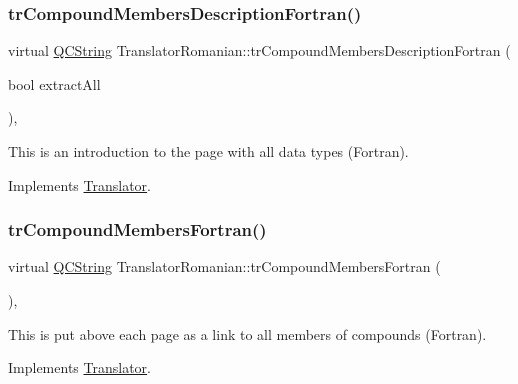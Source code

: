 \mbox{\label{class_translator_romanian_a96e3bb5b689655af4b189686d6fe4068}} 
\subsubsection{\texorpdfstring{trCompoundMembersDescriptionFortran()}{trCompoundMembersDescriptionFortran()}}
{\footnotesize\ttfamily virtual \mbox{\hyperlink{class_q_c_string}{Q\+C\+String}} Translator\+Romanian\+::tr\+Compound\+Members\+Description\+Fortran (\begin{DoxyParamCaption}\item[{bool}]{extract\+All }\end{DoxyParamCaption})\hspace{0.3cm}{\ttfamily [inline]}, {\ttfamily [virtual]}}

This is an introduction to the page with all data types (Fortran). 

Implements \mbox{\hyperlink{class_translator}{Translator}}.

\mbox{\label{class_translator_romanian_a365ba648f73c58d6c308e3152caa9f45}} 
\subsubsection{\texorpdfstring{trCompoundMembersFortran()}{trCompoundMembersFortran()}}
{\footnotesize\ttfamily virtual \mbox{\hyperlink{class_q_c_string}{Q\+C\+String}} Translator\+Romanian\+::tr\+Compound\+Members\+Fortran (\begin{DoxyParamCaption}{ }\end{DoxyParamCaption})\hspace{0.3cm}{\ttfamily [inline]}, {\ttfamily [virtual]}}

This is put above each page as a link to all members of compounds (Fortran). 

Implements \mbox{\hyperlink{class_translator}{Translator}}.

\mbox{\label{class_translator_romanian_aa7d5691dab29bc4d776646d5f92da054}} 
